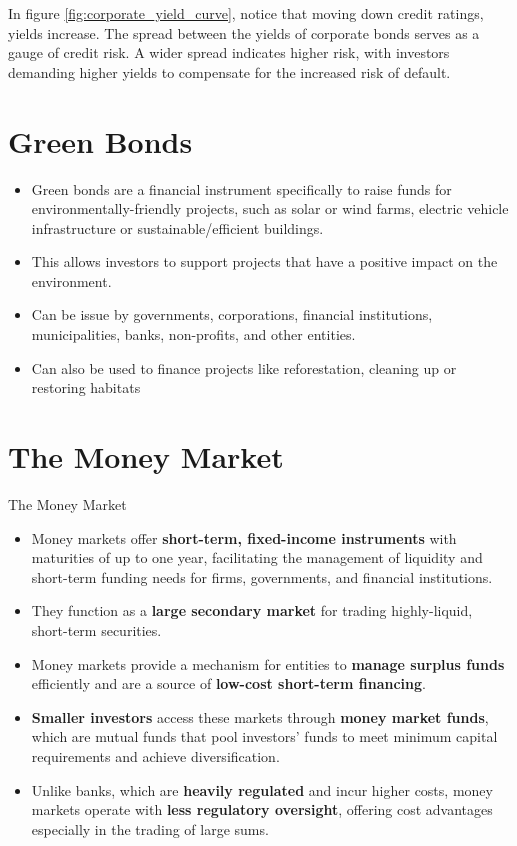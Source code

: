 In figure \ref{fig:corporate_yield_curve}, notice that moving down credit ratings, yields increase. The spread between the yields of corporate bonds serves as a gauge of credit risk. A wider spread indicates higher risk, with investors demanding higher yields to compensate for the increased risk of default.\\


\section{Green Bonds}
\begin{itemize}
    \item Green bonds are a financial instrument specifically to raise funds for environmentally-friendly projects, such as solar or wind farms, electric vehicle infrastructure or sustainable/efficient buildings.
    \item This allows investors to support projects that have a positive impact on the environment.
    \item Can be issue by governments, corporations, financial institutions, municipalities, banks, non-profits, and other entities.
    \item Can also be used to finance projects like reforestation, cleaning up or restoring habitats
\end{itemize}

\section{The Money Market}
\begin{sidenotebox}{The Money Market}

    \begin{itemize}
        \item Money markets offer \textbf{short-term, fixed-income instruments} with maturities of up to one year, facilitating the management of liquidity and short-term funding needs for firms, governments, and financial institutions.
        \item They function as a \textbf{large secondary market} for trading highly-liquid, short-term securities.
        \item Money markets provide a mechanism for entities to \textbf{manage surplus funds} efficiently and are a source of \textbf{low-cost short-term financing}.
        \item \textbf{Smaller investors} access these markets through \textbf{money market funds}, which are mutual funds that pool investors' funds to meet minimum capital requirements and achieve diversification.
        \item Unlike banks, which are \textbf{heavily regulated} and incur higher costs, money markets operate with \textbf{less regulatory oversight}, offering cost advantages especially in the trading of large sums.
    \end{itemize}
\end{sidenotebox}
    